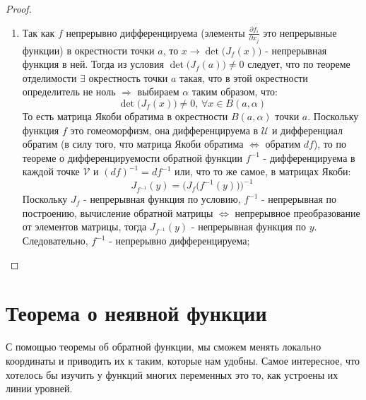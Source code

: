 \documentclass[12pt]{article}
\newcommand{\MU}{\mathcal{U}}
\newcommand{\MV}{\mathcal{V}}
\theoremstyle{definition}
\begin{document}
\begin{proof}
\begin{enumerate}[label ={(\arabic*)}]
		\item Так как $f$ непрерывно дифференцируема (элементы $\tfrac{\partial f_i}{\partial x_j}$ это непрерывные функции) в окрестности точки $a$, то $x \to \det{\big(J_f(x)\big)}$ - непрерывная функция в ней. Тогда из условия $\det{\big(J_f(a)\big)} \neq 0$ следует, что по теореме отделимости $\exists$ окрестность точки $a$ такая, что в этой окрестности определитель не ноль $\Rightarrow$ выбираем $\alpha$ таким образом, что:
		$$
			\det{\big(J_f(x)\big)} \neq 0, \, \forall x \in B(a,\alpha)
		$$
		То есть матрица Якоби обратима в окрестности $B(a,\alpha)$ точки $a$. Поскольку функция $f$ это гомеоморфизм, она дифференцируема в $\MU$ и дифференциал обратим (в силу того, что матрица Якоби обратима $\Leftrightarrow$ обратим $df$), то по теореме о дифференцируемости обратной функции $f^{-1}$ - дифференцируема в каждой точке $\MV$ и $(df)^{-1} = df^{-1}$ или, что то же самое, в матрицах Якоби:
		$$
			J_{f^{-1}}(y) = \Big( J_f\big( f^{-1}(y) \big) \Big)^{-1}
		$$
 		Поскольку $J_f$ - непрерывная функция по условию, $f^{-1}$ - непрерывная по построению, вычисление обратной матрицы $\Leftrightarrow$ непрерывное преобразование от элементов матрицы, тогда $J_{f^{-1}}(y)$ - непрерывная функция по $y$. Следовательно, $f^{-1}$ - непрерывно дифференцируема;
	\end{enumerate}
\end{proof}
\newpage
\section*{Теорема о неявной функции}
С помощью теоремы об обратной функции, мы сможем менять локально координаты и приводить их к таким, которые нам удобны. Самое интересное, что хотелось бы изучить у функций многих переменных это то, как устроены их линии уровней.
\end{document}
